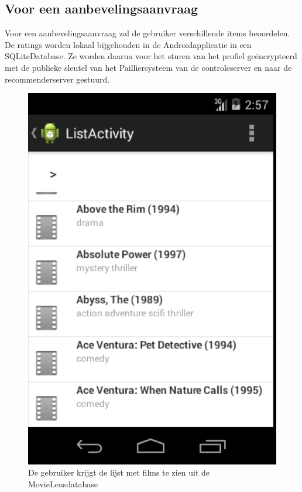 \subsection{Voor een aanbevelingsaanvraag}
\label{voor_aanvraag}
Voor een aanbevelingsaanvraag zal de gebruiker verschillende items beoordelen. De ratings worden lokaal bijgehouden in de Androidapplicatie in een SQLiteDatabase. Ze worden daarna voor het sturen van het profiel ge\"encrypteerd met de publieke sleutel van het Pailliersysteem van de controleserver en naar de recommenderserver gestuurd.

\begin{figure}[htpb]   
    \label{Figuur::all_items}      
  \begin{center}    
 \includegraphics[scale=0.5]{fig/all_items}    
  \end{center}   
  \caption{De gebruiker krijgt de lijst met films te zien uit de MovieLensdatabase}  
   \end{figure}
   
